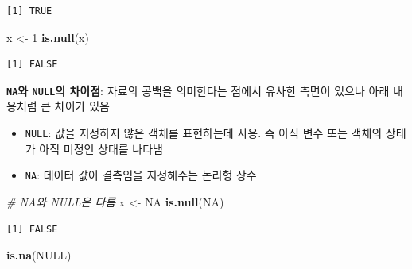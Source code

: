 \documentclass[
  11pt,
]{krantz}
\makeatletter
\newenvironment{Shaded}{\begin{snugshade}}{\end{snugshade}}
\newcommand{\CommentTok}[1]{\textcolor[rgb]{0.37,0.37,0.37}{\textit{#1}}}
\newcommand{\DecValTok}[1]{\textcolor[rgb]{0.06,0.06,0.06}{#1}}
\newcommand{\KeywordTok}[1]{\textcolor[rgb]{0.27,0.27,0.27}{\textbf{#1}}}
\newcommand{\NormalTok}[1]{#1}
\newcommand{\OtherTok}[1]{\textcolor[rgb]{0.37,0.37,0.37}{#1}}
\newcommand{\StringTok}[1]{\textcolor[rgb]{0.5,0.5,0.5}{#1}}
\providecommand{\tightlist}{%
  \setlength{\itemsep}{0pt}\setlength{\parskip}{0pt}}
\newenvironment{kframe}{%
\medskip{}
\setlength{\fboxsep}{.8em}
 \def\at@end@of@kframe{}%
 \ifinner\ifhmode%
  \def\at@end@of@kframe{\end{minipage}}%
  \begin{minipage}{\columnwidth}%
 \fi\fi%
 \def\FrameCommand##1{\hskip\@totalleftmargin \hskip-\fboxsep
 \colorbox{shadecolor}{##1}\hskip-\fboxsep
     \hskip-\linewidth \hskip-\@totalleftmargin \hskip\columnwidth}%
 \MakeFramed {\advance\hsize-\width
   \@totalleftmargin\z@ \linewidth\hsize
   \@setminipage}}%
 {\par\unskip\endMakeFramed%
 \at@end@of@kframe}
\newenvironment{rmdblock}[1]
  {
  \begin{itemize}
  \renewcommand{\labelitemi}{
    \raisebox{-.7\height}[0pt][0pt]{
      {\setkeys{Gin}{width=3em,keepaspectratio}\texttt{[image: images/\#1]}}
    }
  }
  \setlength{\fboxsep}{1em}
  \begin{kframe}
  \item
  }
  {
  \end{kframe}
  \end{itemize}
  }
\newenvironment{rmdnote}
  {\begin{rmdblock}{note}}
  {\end{rmdblock}}
\makeatother
\begin{document}
\begin{verbatim}
[1] TRUE
\end{verbatim}

\begin{Shaded}
\begin{Highlighting}[]
\NormalTok{x <-}\StringTok{ }\DecValTok{1}
\KeywordTok{is.null}\NormalTok{(x) }
\end{Highlighting}
\end{Shaded}

\begin{verbatim}
[1] FALSE
\end{verbatim}

\normalsize

\footnotesize

\begin{rmdnote}
\begin{rmdnote}

\textbf{\texttt{NA}와 \texttt{NULL}의 차이점}: 자료의 공백을 의미한다는 점에서 유사한 측면이 있으나 아래 내용처럼 큰 차이가 있음

\begin{itemize}
\tightlist
\item
  \texttt{NULL}: 값을 지정하지 않은 객체를 표현하는데 사용. 즉 아직 변수 또는 객체의 상태가 아직 미정인 상태를 나타냄
\item
  \texttt{NA}: 데이터 값이 결측임을 지정해주는 논리형 상수
\end{itemize}

\end{rmdnote}
\end{rmdnote}

\normalsize

\footnotesize

\begin{Shaded}
\begin{Highlighting}[]
\CommentTok{# NA와 NULL은 다름}
\NormalTok{x <-}\StringTok{ }\OtherTok{NA}
\KeywordTok{is.null}\NormalTok{(}\OtherTok{NA}\NormalTok{)}
\end{Highlighting}
\end{Shaded}

\begin{verbatim}
[1] FALSE
\end{verbatim}

\begin{Shaded}
\begin{Highlighting}[]
\KeywordTok{is.na}\NormalTok{(}\OtherTok{NULL}\NormalTok{)}
\end{Highlighting}
\end{Shaded}
\end{document}
